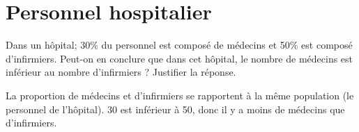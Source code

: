 \section{Personnel hospitalier}

Dans un hôpital; 30\% du personnel est composé de médecins et 50\% est composé d'infirmiers. Peut-on en conclure que dans cet hôpital, le nombre de médecins est inférieur au nombre d'infirmiers ? Justifier la réponse.

\begin{solution}
	La proportion de médecins et d'infirmiers se rapportent à la même population (le personnel de l'hôpital). 30 est inférieur à 50, donc il y a moins de médecins que d'infirmiers.
\end{solution}